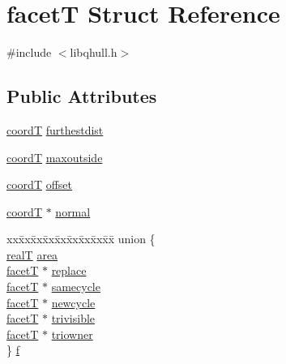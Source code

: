 \hypertarget{structfacetT}{}\section{facet\+T Struct Reference}
\label{structfacetT}


{\ttfamily \#include $<$libqhull.\+h$>$}

\subsection*{Public Attributes}
\begin{DoxyCompactItemize}
\item 
\hyperlink{libqhull_8h_ada1b5d65f4fb1648eef2fa3684de1766}{coord\+T} \hyperlink{structfacetT_a32b9cb5f973ad7073f860d895c446acb}{furthestdist}
\item 
\hyperlink{libqhull_8h_ada1b5d65f4fb1648eef2fa3684de1766}{coord\+T} \hyperlink{structfacetT_a39622f31db2811584334210c779a648c}{maxoutside}
\item 
\hyperlink{libqhull_8h_ada1b5d65f4fb1648eef2fa3684de1766}{coord\+T} \hyperlink{structfacetT_adeb65af87caf90b061a9192a3d283713}{offset}
\item 
\hyperlink{libqhull_8h_ada1b5d65f4fb1648eef2fa3684de1766}{coord\+T} $\ast$ \hyperlink{structfacetT_aec953ca68201b0a1c4bd3f2b8b19b82c}{normal}
\item 
\begin{tabbing}
xx\=xx\=xx\=xx\=xx\=xx\=xx\=xx\=xx\=\kill
union \{\\
\>\hyperlink{user_8h_ad6fe71dff955732ea8682263e9540bb7}{realT} \hyperlink{structfacetT_aaa7fd9175845daaaf3015f5964a9ce3d}{area}\\
\>\hyperlink{structfacetT}{facetT} $\ast$ \hyperlink{structfacetT_af761e2b88c964931eeb70eb49e5fdd37}{replace}\\
\>\hyperlink{structfacetT}{facetT} $\ast$ \hyperlink{structfacetT_a7451a87c771f1606542fccc01966f043}{samecycle}\\
\>\hyperlink{structfacetT}{facetT} $\ast$ \hyperlink{structfacetT_a682b0ea2d8e9927ae437e4ce103b5e88}{newcycle}\\
\>\hyperlink{structfacetT}{facetT} $\ast$ \hyperlink{structfacetT_a60f289fb95d5bfe600692bafd15e0d55}{trivisible}\\
\>\hyperlink{structfacetT}{facetT} $\ast$ \hyperlink{structfacetT_a9f412c007150ad02f21d3f49e1ac373b}{triowner}\\
\} \hyperlink{structfacetT_a213905eb90c5a3c940278c241ae10fbb}{f}\\


\end{tabbing}
\end{DoxyCompactItemize}
